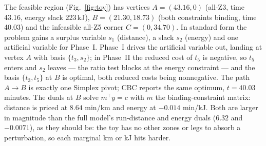 \documentclass[11pt,a4paper]{article}
\begin{document}
The feasible region (Fig.~\ref{fig:toy}) has vertices $A = (43.16, 0)$
(all-Z3, time 43.16, energy slack 223\,kJ), $B = (21.30, 18.73)$ (both
constraints binding, time 40.03) and the infeasible all-Z5 corner
$C = (0, 34.70)$. In standard form the problem gains a surplus variable $s_1$
(distance), a slack $s_2$ (energy) and one artificial variable for Phase~I.
Phase~I drives the artificial variable out, landing at vertex $A$ with basis
$\{t_3, s_2\}$; in Phase~II the reduced cost of $t_5$ is negative, so $t_5$
enters and $s_2$ leaves --- the ratio test blocks at the energy constraint ---
and the basis $\{t_3, t_5\}$ at $B$ is optimal, both reduced costs being
nonnegative. The path $A \to B$ is exactly one Simplex pivot;
CBC reports the same optimum, $t = 40.03$ minutes. The duals at $B$ solve
$m^{\top} y = c$ with $m$ the binding-constraint matrix: distance is priced at
$8.64$ min/km and energy at $-0.014$ min/kJ. Both are larger in magnitude than
the full model's run-distance and energy duals ($6.32$ and $-0.0071$), as they
should be: the toy has no other zones or legs to absorb a perturbation, so each
marginal km or kJ hits harder.
\end{document}
